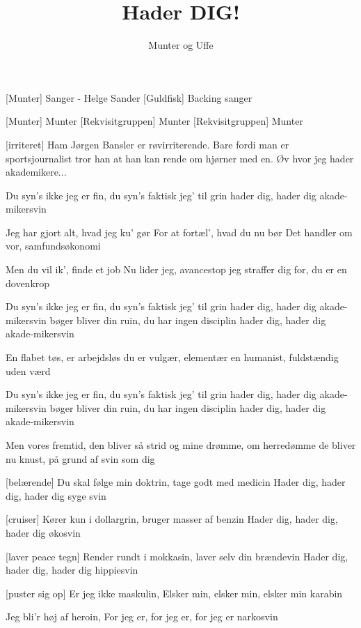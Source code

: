 \documentclass[a4paper,11pt]{article}
\title{Hader DIG!}
\author{Munter og Uffe}
\begin{document}
\maketitle

\begin{roles}  
[Munter] Sanger - Helge Sander
[Guldfisk] Backing sanger
\end{roles}

\begin{props}
[Munter] Munter
[Rekvisitgruppen] Munter
[Rekvisitgruppen] Munter
\end{props}

\begin{song}

[irriteret] Ham Jørgen Bansler er røvirriterende. Bare fordi 
man er sportsjournalist tror han at han kan rende om hjørner med en. Øv 
hvor jeg hader akademikere...


   Du syn's ikke jeg er fin, du syn's faktisk jeg' til grin
hader dig, hader dig akade-mikersvin

 Jeg har gjort alt, hvad jeg ku' gør
For at fortæl', hvad du nu bør
 Det handler om vor, samfundsøkonomi

 Men du vil ik', finde et job
Nu lider jeg, avancestop
 jeg straffer dig for, du er en dovenkrop

 Du syn's ikke jeg er fin, du syn's faktisk jeg' til grin
hader dig, hader dig akade-mikersvin
bøger bliver din ruin, du har ingen disciplin
hader dig, hader dig akade-mikersvin

 En flabet tøs, er arbejdsløs
du er vulgær, elementær
 en humanist, fuldstændig uden værd

 Du syn's ikke jeg er fin, du syn's faktisk jeg' til grin
hader dig, hader dig akade-mikersvin
bøger bliver din ruin, du har ingen disciplin
hader dig, hader dig akade-mikersvin

 Men vores fremtid, den bliver så strid
og mine drømme, om herredømme
 de bliver nu knust, på grund af svin som dig

[belærende] Du skal følge min doktrin, tage godt med medicin
Hader dig, hader dig, hader dig syge svin

[cruiser] Kører kun i dollargrin, bruger masser af benzin
Hader dig, hader dig, hader dig økosvin

[laver peace tegn] Render rundt i mokkasin, laver selv din 
brændevin
Hader dig, hader dig, hader dig hippiesvin 

[puster sig op] Er jeg ikke maskulin,
Elsker min, elsker min, elsker min karabin

 Jeg bli'r høj af heroin,
For jeg er, for jeg er, for jeg er narkosvin
\end{song}
\end{document}
